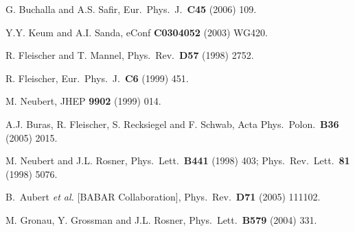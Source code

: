 \documentclass[11pt]{cernrep}
\begin{document}
\begin{thebibliography}{999}
G. Buchalla and A.S. Safir,
 Eur.\ Phys.\ J.\  {\bf C45} (2006) 109.

Y.Y. Keum and A.I. Sanda,
  { eConf} {\bf C0304052} (2003) WG420.
  
  R. Fleischer and T. Mannel,
{ Phys.\ Rev.}~{\bf D57} (1998) 2752.

R. Fleischer,
{ Eur.\ Phys.\ J.}~{\bf C6} (1999) 451.

M. Neubert,
{ JHEP} {\bf 9902} (1999) 014.

A.J. Buras, R. Fleischer, S. Recksiegel and F. Schwab,
{ Acta Phys.\ Polon.}~{\bf B36} (2005) 2015.
  
M. Neubert and J.L. Rosner,
{ Phys.\ Lett.}~{\bf B441} (1998) 403;
{ Phys.\ Rev.\ Lett.}~{\bf 81} (1998) 5076.

B.~Aubert {\it et al.}  [BABAR Collaboration],
 { Phys.\ Rev.}~{\bf D71} (2005) 111102.
  
M. Gronau, Y. Grossman and J.L. Rosner,
  { Phys.\ Lett.}~{\bf B579} (2004) 331.


\end{thebibliography}
\end{document}
